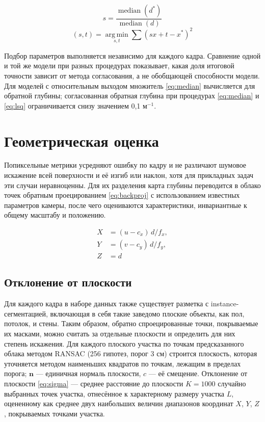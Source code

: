 \documentclass{misisarticle}
\begin{document}
\begin{equation}
  s = \frac{\operatorname{median}(d^*)}{\operatorname{median}(d)}
  \label{eq:median}
\end{equation}
\begin{equation}
  (s, t) = \operatorname*{arg\,min}_{s,t} \sum (s x + t - x^*)^2
  \label{eq:lsq}
\end{equation}

Подбор параметров выполняется независимо для каждого кадра. Сравнение одной и той же модели при разных процедурах показывает, какая доля итоговой точности зависит от метода согласования, а не обобщающей способности модели. Для моделей с относительным выходом множитель \eqref{eq:median} вычисляется для обратной глубины; согласованная обратная глубина при процедурах \eqref{eq:median} и \eqref{eq:lsq} ограничивается снизу значением 0,1 м$^{-1}$.

\section{Геометрическая оценка}

Попиксельные метрики усредняют ошибку по кадру и не различают шумовое искажение всей поверхности и её изгиб или наклон, хотя для прикладных задач эти случаи неравноценны. Для их разделения карта глубины переводится в облако точек обратным проецированием \eqref{eq:backproj} с использованием известных параметров камеры, после чего оцениваются характеристики, инвариантные к общему масштабу и положению.

\begin{equation}
  \begin{aligned}
    X &= (u - c_x)\, d / f_x, \\
    Y &= (v - c_y)\, d / f_y, \\
    Z &= d
  \end{aligned}
  \label{eq:backproj}
\end{equation}

\subsection{Отклонение от плоскости}

Для каждого кадра в наборе данных также существует разметка с instance-сегментацией, включающая в себя такие заведомо плоские объекты, как пол, потолок, и стены. Таким образом, обратно спроецированные точки, покрываемые их масками, можно считать за отдельные плоскости и определить для них степень искажения. Для каждого плоского участка по точкам предсказанного облака методом RANSAC (256 гипотез, порог 3 см) строится плоскость, которая уточняется методом наименьших квадратов по точкам, лежащим в пределах порога; $\mathbf{n}$ --- единичная нормаль плоскости, $c$ --- её смещение. Отклонение от плоскости \eqref{eq:sigma} --- среднее расстояние до плоскости $K = 1000$ случайно выбранных точек участка, отнесённое к характерному размеру участка $L$, оцененному как среднее двух наибольших величин диапазонов координат $X$, $Y$, $Z$, покрываемых точками участка.
\end{document}
